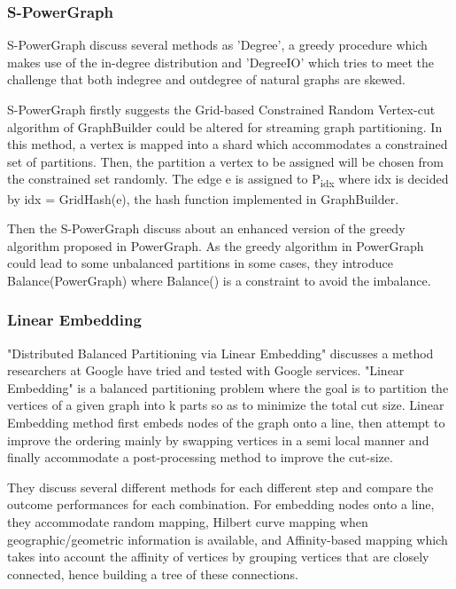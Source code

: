 \documentclass[12pt]{article}
\begin{document}
\subsubsection{S-PowerGraph}

S-PowerGraph\cite{S-PowerGraph} discuss several methods as 'Degree', a greedy procedure which makes use of the in-degree distribution and 'DegreeIO' which tries to meet the challenge that both indegree and outdegree of natural graphs are skewed.

S-PowerGraph firstly suggests the Grid-based Constrained Random Vertex-cut algorithm of GraphBuilder\cite{Graphbuilder}  could be altered for streaming graph partitioning. In this method, a vertex is mapped into a shard which accommodates a constrained set of partitions. Then, the partition a vertex to be assigned will be chosen from the constrained set randomly. The edge e is assigned to P\textsubscript{idx} where idx is decided by idx = GridHash(e), the hash function implemented in GraphBuilder.

Then the S-PowerGraph discuss about an enhanced version of the greedy algorithm proposed in PowerGraph\cite{PowerGraph}. As the greedy algorithm in PowerGraph could lead to some unbalanced partitions in some cases, they introduce Balance(PowerGraph) where Balance() is a constraint to avoid the imbalance. 

\subsubsection{Linear Embedding}

"Distributed Balanced Partitioning via Linear Embedding"\cite{Linear Embedding} discusses a method researchers at Google have tried and tested with Google services. "Linear Embedding" is a balanced partitioning problem where the goal is to partition the vertices of a given graph into k parts so as to minimize the total cut size. Linear Embedding method first embeds nodes of the graph onto a line, then attempt to improve the ordering mainly by swapping vertices in a semi local manner and finally accommodate a post-processing method to improve the cut-size.

They discuss several different methods for each different step and compare the outcome performances for each combination. For embedding nodes onto a line,  they accommodate random mapping, Hilbert curve mapping when geographic/geometric information is available, and Affinity-based mapping which takes into account the affinity of vertices by grouping vertices that are closely connected, hence building a tree of these connections.
\end{document}
